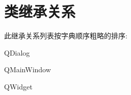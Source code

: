 \section{类继承关系}
此继承关系列表按字典顺序粗略的排序\+: \begin{DoxyCompactList}
\item {}
\item Q\+Dialog\begin{DoxyCompactList}
\item {}
\item {}
\end{DoxyCompactList}
\item Q\+Main\+Window\begin{DoxyCompactList}
\item {}
\end{DoxyCompactList}
\item Q\+Widget\begin{DoxyCompactList}
\item {}
\end{DoxyCompactList}
\end{DoxyCompactList}
